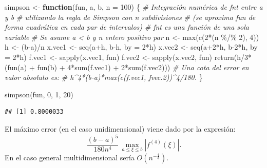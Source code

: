 \documentclass[
]{book}
\newenvironment{Shaded}{\begin{snugshade}}{\end{snugshade}}
\newcommand{\AttributeTok}[1]{\textcolor[rgb]{0.77,0.63,0.00}{#1}}
\newcommand{\CommentTok}[1]{\textcolor[rgb]{0.56,0.35,0.01}{\textit{#1}}}
\newcommand{\ControlFlowTok}[1]{\textcolor[rgb]{0.13,0.29,0.53}{\textbf{#1}}}
\newcommand{\DecValTok}[1]{\textcolor[rgb]{0.00,0.00,0.81}{#1}}
\newcommand{\FunctionTok}[1]{\textcolor[rgb]{0.00,0.00,0.00}{#1}}
\newcommand{\NormalTok}[1]{#1}
\newcommand{\OtherTok}[1]{\textcolor[rgb]{0.56,0.35,0.01}{#1}}
\newcommand{\SpecialCharTok}[1]{\textcolor[rgb]{0.00,0.00,0.00}{#1}}
\theoremstyle{break}
\theoremstyle{definition}
\theoremstyle{definition}
\theoremstyle{definition}
\theoremstyle{definition}
\theoremstyle{remark}
\begin{document}
\begin{Shaded}
\begin{Highlighting}[]
\NormalTok{simpson }\OtherTok{\textless{}{-}} \ControlFlowTok{function}\NormalTok{(fun, a, b, }\AttributeTok{n =} \DecValTok{100}\NormalTok{) \{ }
\CommentTok{\# Integración numérica de fnt entre a y b}
\CommentTok{\# utilizando la regla de Simpson con n subdivisiones}
\CommentTok{\# (se aproxima fun de forma cuadrática en cada par de intervalos)  }
\CommentTok{\# fnt es una función de una sola variable}
\CommentTok{\# Se asume a \textless{} b y n entero positivo par }
\NormalTok{  n }\OtherTok{\textless{}{-}} \FunctionTok{max}\NormalTok{(}\FunctionTok{c}\NormalTok{(}\DecValTok{2}\SpecialCharTok{*}\NormalTok{(n }\SpecialCharTok{\%/\%} \DecValTok{2}\NormalTok{), }\DecValTok{4}\NormalTok{))}
\NormalTok{  h }\OtherTok{\textless{}{-}}\NormalTok{ (b}\SpecialCharTok{{-}}\NormalTok{a)}\SpecialCharTok{/}\NormalTok{n}
\NormalTok{  x.vec1 }\OtherTok{\textless{}{-}} \FunctionTok{seq}\NormalTok{(a}\SpecialCharTok{+}\NormalTok{h, b}\SpecialCharTok{{-}}\NormalTok{h, }\AttributeTok{by =} \DecValTok{2}\SpecialCharTok{*}\NormalTok{h)}
\NormalTok{  x.vec2 }\OtherTok{\textless{}{-}} \FunctionTok{seq}\NormalTok{(a}\SpecialCharTok{+}\DecValTok{2}\SpecialCharTok{*}\NormalTok{h, b}\DecValTok{{-}2}\SpecialCharTok{*}\NormalTok{h, }\AttributeTok{by =} \DecValTok{2}\SpecialCharTok{*}\NormalTok{h)}
\NormalTok{  f.vec1 }\OtherTok{\textless{}{-}} \FunctionTok{sapply}\NormalTok{(x.vec1, fun)}
\NormalTok{  f.vec2 }\OtherTok{\textless{}{-}} \FunctionTok{sapply}\NormalTok{(x.vec2, fun)}
  \FunctionTok{return}\NormalTok{(h}\SpecialCharTok{/}\DecValTok{3}\SpecialCharTok{*}\NormalTok{(}\FunctionTok{fun}\NormalTok{(a) }\SpecialCharTok{+} \FunctionTok{fun}\NormalTok{(b) }\SpecialCharTok{+} \DecValTok{4}\SpecialCharTok{*}\FunctionTok{sum}\NormalTok{(f.vec1) }\SpecialCharTok{+} \DecValTok{2}\SpecialCharTok{*}\FunctionTok{sum}\NormalTok{(f.vec2)))}
  \CommentTok{\# Una cota del error en valor absoluto es:}
  \CommentTok{\# h\^{}4*(b{-}a)*max(c(f.vec1, fvec.2))\^{}4/180.}
\NormalTok{\}}

\FunctionTok{simpson}\NormalTok{(fun, }\DecValTok{0}\NormalTok{, }\DecValTok{1}\NormalTok{, }\DecValTok{20}\NormalTok{)}
\end{Highlighting}
\end{Shaded}

\begin{verbatim}
## [1] 0.8000033
\end{verbatim}

El máximo error (en el caso unidimensional) viene dado por la expresión:
\[\frac{(b-a)^5}{180n^4}\,\max_{a\leq \xi \leq b}\left| f^{(4)}(\xi) \right|.\]
En el caso general multidimensional sería \(O(n^{-\frac{4}{d}})\).
\end{document}
